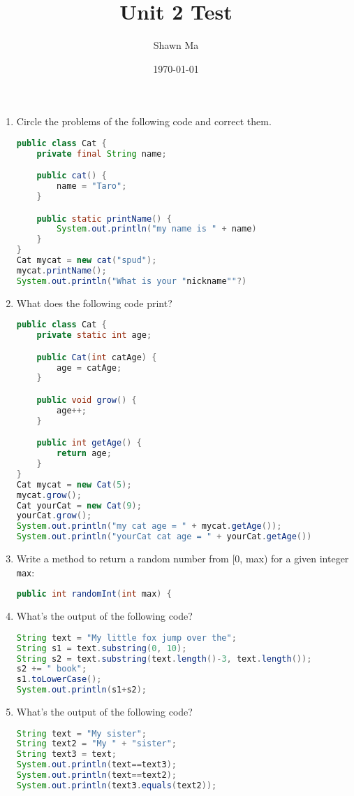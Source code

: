 \documentclass[letterpaper,12pt]{article}
\author{Shawn Ma}
\date{\today}
\title{Unit 2 Test}
\begin{document}
\begin{enumerate}

  \item Circle the problems of the following code and correct them.
    \begin{lstlisting}[language=Java]
public class Cat {
    private final String name;

    public cat() {
        name = "Taro";
    }

    public static printName() {
        System.out.println("my name is " + name)
    }
}
Cat mycat = new cat("spud");
mycat.printName();
System.out.println("What is your "nickname""?)
    \end{lstlisting}

    \item What does the following code print?
    \begin{lstlisting}[language=Java]
public class Cat {
    private static int age;

    public Cat(int catAge) {
        age = catAge;
    }

    public void grow() {
        age++;
    }

    public int getAge() {
        return age;
    }
}
Cat mycat = new Cat(5);
mycat.grow();
Cat yourCat = new Cat(9);
yourCat.grow();
System.out.println("my cat age = " + mycat.getAge());
System.out.println("yourCat cat age = " + yourCat.getAge())
    \end{lstlisting}

\item Write a method to return a random number from [0, max) for a given integer \verb|max|:
\begin{lstlisting}[language=Java]
    public int randomInt(int max) {

\end{lstlisting}
\vspace{1in}

\item What's the output of the following code? %
\begin{lstlisting}[language=Java]
String text = "My little fox jump over the";
String s1 = text.substring(0, 10);
String s2 = text.substring(text.length()-3, text.length());
s2 += " book";
s1.toLowerCase();
System.out.println(s1+s2);

\end{lstlisting}

\item What's the output of the following code?
\begin{lstlisting}[language=Java]
String text = "My sister";
String text2 = "My " + "sister";
String text3 = text;
System.out.println(text==text3);
System.out.println(text==text2);
System.out.println(text3.equals(text2));
\end{lstlisting}



\end{enumerate}
\end{document}
